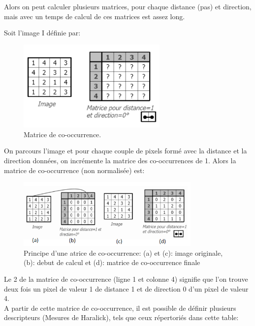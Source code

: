 Alors on peut calculer plusieurs matrices, pour chaque distance (pas) et direction, mais avec un temps de calcul de ces matrices est assez long.

Soit l’image I définie par:

\begin{figure}[H]
	\label{fig:cooc}
	\centering
	\includegraphics[width=0.65\textwidth]{Figures/cooc} %
	\caption{Matrice de co-occurrence.}
\end{figure}

On parcours l'image et pour chaque couple de pixels formé avec la distance et la direction données, on incrémente la matrice des co-occurrences de 1. Alors la matrice de co-occurrence (non normalisée) est:

\begin{figure}[H]
	\label{fig:cooc_nn}
	\centering
	\includegraphics[width=0.8\textwidth]{Figures/cooc_non_norm} %
	\caption{Principe d'une atrice de co-occurrence:
	(a) et (c): image originale, (b): debut de calcul et (d): matrice de co-occurrence finale}
\end{figure}

Le 2 de la matrice de co-occurrence (ligne 1 et colonne 4) signifie que l’on trouve deux fois un pixel de valeur 1 de distance 1 et de direction
0 d’un pixel de valeur 4.\\


A partir de cette matrice de co-occurrence, il est possible de définir plusieurs descripteurs (Mesures de Haralick), tels que ceux répertoriés dans cette table:


